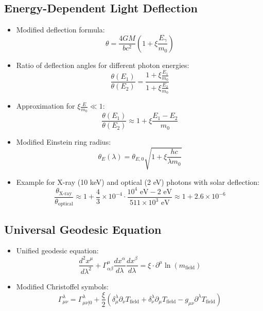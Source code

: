\documentclass[12pt,a4paper]{article}
\begin{document}
\subsection{Energy-Dependent Light Deflection}
\begin{itemize}
	\item Modified deflection formula:
	\begin{equation}
		\boxed{\theta = \frac{4GM}{bc^2}\left(1 + \xi \frac{E_\gamma}{m_0}\right)}
	\end{equation}
	
	\item Ratio of deflection angles for different photon energies:
	\begin{equation}
		\frac{\theta(E_1)}{\theta(E_2)} = \frac{1 + \xi \frac{E_1}{m_0}}{1 + \xi \frac{E_2}{m_0}}
	\end{equation}
	
	\item Approximation for $\xi \frac{E}{m_0} \ll 1$:
	\begin{equation}
		\frac{\theta(E_1)}{\theta(E_2)} \approx 1 + \xi \frac{E_1 - E_2}{m_0}
	\end{equation}
	
	\item Modified Einstein ring radius:
	\begin{equation}
		\theta_E(\lambda) = \theta_{E,0} \sqrt{1 + \xi \frac{hc}{\lambda m_0}}
	\end{equation}
	
	\item Example for X-ray (10 keV) and optical (2 eV) photons with solar deflection:
	\begin{equation}
		\frac{\theta_{\text{X-ray}}}{\theta_{\text{optical}}} \approx 1 + \frac{4}{3} \times 10^{-4} \cdot \frac{10^4 \text{ eV} - 2 \text{ eV}}{511 \times 10^3 \text{ eV}} \approx 1 + 2.6 \times 10^{-6}
	\end{equation}
\end{itemize}

\subsection{Universal Geodesic Equation}
\begin{itemize}
	\item Unified geodesic equation:
	\begin{equation}
		\boxed{\frac{d^2 x^\mu}{d\lambda^2} + \Gamma^\mu_{\alpha\beta}\frac{dx^\alpha}{d\lambda}\frac{dx^\beta}{d\lambda} = \xi \cdot \partial^\mu \ln(m_{\text{field}})}
	\end{equation}
	
	\item Modified Christoffel symbols:
	\begin{equation}
		\Gamma^\lambda_{\mu\nu} = \Gamma^\lambda_{\mu\nu|0} + \frac{\xi}{2} \left(\delta^\lambda_\mu \partial_\nu T_{\text{field}} + \delta^\lambda_\nu \partial_\mu T_{\text{field}} - g_{\mu\nu} \partial^\lambda T_{\text{field}}\right)
	\end{equation}
\end{itemize}
\end{document}
